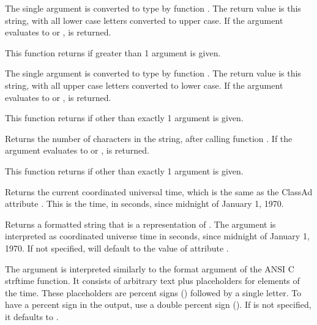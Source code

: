 \begin{description}
  \item[\Code{String toUpper(AnyType Expr)}]
    The single argument is converted to type  by function .
    The return value is this string, with all lower case letters converted to
    upper case.
    If the argument evaluates to  or ,
     is returned.

    This function returns  if greater than 1
    argument is given.

  \item[\Code{String toLower(AnyType Expr)}]
    The single argument is converted to type  by function .
    The return value is this string, with all upper case letters converted to
    lower case.
    If the argument evaluates to  or ,
     is returned.

    This function returns  if other than exactly 1
    argument is given.

  \item[\Code{Integer size(AnyType Expr)}]
    Returns the number of characters in the string, after calling function
    .
    If the argument evaluates to  or ,
     is returned.

    This function returns  if other than exactly 1
    argument is given.

  \item[\Code{Integer time()}]
    Returns the current coordinated universal time, which is the same
    as the ClassAd attribute .
    This is the time, in seconds, since midnight of January 1, 1970.

  \item[\Code{String formatTime(\Lbr\ Integer time \Rbr\ \Lbr\ , String format \Rbr)}]

    Returns a formatted string that is a representation of .
    The argument  is interpreted as coordinated universe time in
    seconds, since midnight of January 1, 1970. If not specified,
     will default to the value of attribute .
		
    The argument  is interpreted similarly to the format
    argument of the ANSI C strftime function. It consists of arbitrary text
    plus placeholders for elements of the time. These placeholders are
    percent signs (\Percent) followed by a single letter.
    To have a percent sign in
    the output, use a double percent sign (\Percent\Percent).  If
     is not specified, it defaults to .


\end{description}
